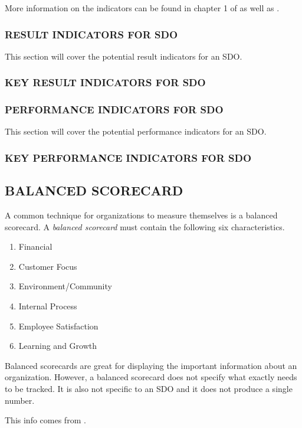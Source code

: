 \documentclass[SDSUThesis.tex]{subfiles}
\begin{document}
More information on the indicators can be found
in chapter 1 of \cite{parmenter2010}
as well as \cite{florac1999,kaplan1992}.

\subsubsection{RESULT INDICATORS FOR SDO}
    This section will cover the potential result indicators for an SDO.
    
\subsubsection{KEY RESULT INDICATORS FOR SDO}


\subsubsection{PERFORMANCE INDICATORS FOR SDO}
    This section will cover the potential performance indicators for an SDO.
    
    
\subsubsection{KEY PERFORMANCE INDICATORS FOR SDO}
    

\subsection{BALANCED SCORECARD}

A common technique for organizations to measure themselves is a balanced scorecard.
A \textit{balanced scorecard} must contain the following six
characteristics.
\begin{enumerate}
  \item Financial 
  \item Customer Focus
  \item Environment/Community
  \item Internal Process
  \item Employee Satisfaction
  \item Learning and Growth
\end{enumerate}

Balanced scorecards are great for displaying the important information about
an organization.  However, a balanced scorecard does not specify what
exactly needs to be tracked.  It is also not specific to an SDO and 
it does not produce a single number.

This info comes from \cite{parmenter2010}.
\end{document}
